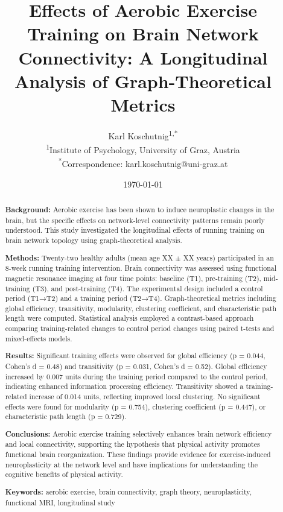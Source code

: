 \documentclass[12pt,a4paper]{article}
\title{\textbf{Effects of Aerobic Exercise Training on Brain Network Connectivity: A Longitudinal Analysis of Graph-Theoretical Metrics}}
\author{
    Karl Koschutnig\textsuperscript{1,*} \\
    \small \textsuperscript{1}Institute of Psychology, University of Graz, Austria \\
    \small \textsuperscript{*}Correspondence: karl.koschutnig@uni-graz.at
}
\date{\today}
\begin{document}
\maketitle

\begin{abstract}
\textbf{Background:} Aerobic exercise has been shown to induce neuroplastic changes in the brain, but the specific effects on network-level connectivity patterns remain poorly understood. This study investigated the longitudinal effects of running training on brain network topology using graph-theoretical analysis.

\textbf{Methods:} Twenty-two healthy adults (mean age XX $\pm$ XX years) participated in an 8-week running training intervention. Brain connectivity was assessed using functional magnetic resonance imaging at four time points: baseline (T1), pre-training (T2), mid-training (T3), and post-training (T4). The experimental design included a control period (T1→T2) and a training period (T2→T4). Graph-theoretical metrics including global efficiency, transitivity, modularity, clustering coefficient, and characteristic path length were computed. Statistical analysis employed a contrast-based approach comparing training-related changes to control period changes using paired t-tests and mixed-effects models.

\textbf{Results:} Significant training effects were observed for global efficiency (p = 0.044, Cohen's d = 0.48) and transitivity (p = 0.031, Cohen's d = 0.52). Global efficiency increased by 0.007 units during the training period compared to the control period, indicating enhanced information processing efficiency. Transitivity showed a training-related increase of 0.014 units, reflecting improved local clustering. No significant effects were found for modularity (p = 0.754), clustering coefficient (p = 0.447), or characteristic path length (p = 0.729).

\textbf{Conclusions:} Aerobic exercise training selectively enhances brain network efficiency and local connectivity, supporting the hypothesis that physical activity promotes functional brain reorganization. These findings provide evidence for exercise-induced neuroplasticity at the network level and have implications for understanding the cognitive benefits of physical activity.

\textbf{Keywords:} aerobic exercise, brain connectivity, graph theory, neuroplasticity, functional MRI, longitudinal study
\end{abstract}
\end{document}
